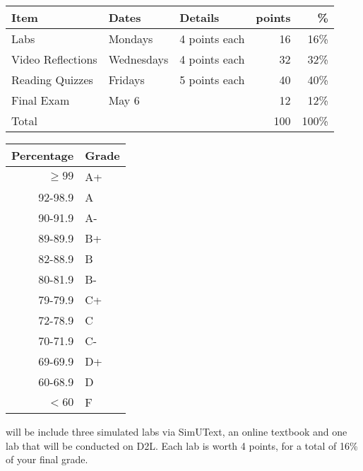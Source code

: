 \documentclass{tufte-handout}
\begin{document}
\begin{table}
\begin{tabular}{l l l r r }
Item & Dates & Details & points &  \% \\
\hline
Labs & Mondays & 4 points each & 16 & 16\% \\
Video Reflections  & Wednesdays & 4 points each & 32 & 32\% \\
Reading Quizzes & Fridays & 5 points each & 40 & 40\% \\
Final Exam & May 6 & & 12  & 12\% \\
\hline
Total & & & 100 & 100\% \\
\end{tabular}
\end{table}

\begin{margintable}
\begin{tabular}{rl}
Percentage & Grade \\
\hline 
$\ge99$ & A+ \\
92-98.9 & A \\
90-91.9 & A- \\
89-89.9 & B+ \\
82-88.9 & B \\
80-81.9 & B- \\
79-79.9 & C+ \\
72-78.9 & C \\
70-71.9 & C- \\
69-69.9 & D+ \\
60-68.9 & D \\
$<60$ & F \\
\hline
\end{tabular}
\end{margintable}



 will be include three simulated labs via SimUText, an online textbook and one lab that will be conducted on D2L. Each lab is worth 4 points, for a total of 16\% of your final grade. 
\end{document}
